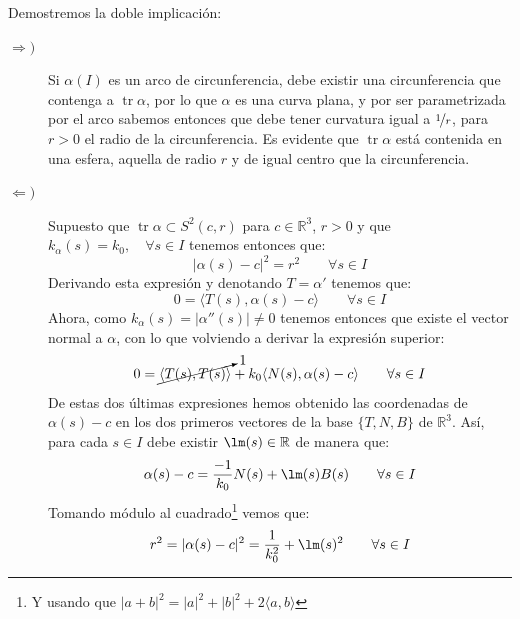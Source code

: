 \documentclass[12pt]{article}
\DeclareMathOperator{\tr}{tr}
\begin{document}
\begin{ejercicio}[3 puntos]
        \noindent
        Demostremos la doble implicación:
        \begin{description}
            \item [$\Longrightarrow )$] Si $\alpha(I)$ es un arco de circunferencia, debe existir una circunferencia que contenga a $\tr\alpha$, por lo que $\alpha$ es una curva plana, y por ser parametrizada por el arco sabemos entonces que debe tener curvatura igual a $\nicefrac{1}{r}$, para $r>0$ el radio de la circunferencia. Es evidente que $\tr\alpha$ está contenida en una esfera, aquella de radio $r$ y de igual centro que la circunferencia.
            \item [$\Longleftarrow )$] Supuesto que $\tr\alpha\subset S^2(c,r)$ para $c\in \mathbb{R}^3$, $r>0$ y que $k_\alpha(s) = k_0, \quad \forall s\in I$ tenemos entonces que:
                \begin{equation*}
                    |\alpha(s) - c|^2 = r^2 \qquad \forall s\in I
                \end{equation*}
                Derivando esta expresión y denotando $T = \alpha'$ tenemos que:
                \begin{equation*}
                    0 = \langle T(s),\alpha(s)-c \rangle  \qquad \forall s\in I
                \end{equation*}
                Ahora, como $k_\alpha(s) = |\alpha''(s)| \neq 0$ tenemos entonces que existe el vector normal a $\alpha$, con lo que volviendo a derivar la expresión superior:
                \begin{equation*}
                    0 = \cancelto{1}{\langle T(s),T(s) \rangle } + k_0 \langle N(s),\alpha(s)-c \rangle  \qquad \forall s\in I
                \end{equation*}
                De estas dos últimas expresiones hemos obtenido las coordenadas de $\alpha(s)-c$ en los dos primeros vectores de la base $\{T,N,B\}$ de $\mathbb{R}^3$. Así, para cada $s\in I$ debe existir $\lm(s)\in \mathbb{R}$ de manera que:
                \begin{equation*}
                    \alpha(s) - c = \frac{-1}{k_0}N(s) + \lm(s)B(s) \qquad \forall s\in I
                \end{equation*}
                Tomando módulo al cuadrado\footnote{Y usando que $|a+b|^2 = |a|^2 + |b|^2 + 2\langle a,b \rangle $} vemos que:
                \begin{equation*}
                    r^2 = |\alpha(s)-c|^2 = \frac{1}{k_0^2} + \lm(s)^2 \qquad \forall s\in I
                \end{equation*}

\end{description}
\end{ejercicio}
\end{document}
